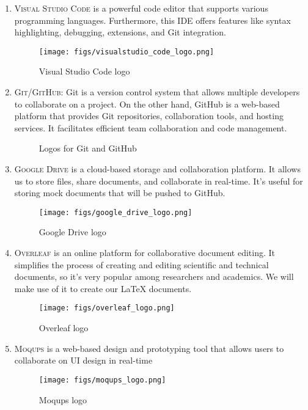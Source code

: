 \documentclass[conference]{IEEEtran}
\begin{document}
\begin{enumerate}
    \item \textsc{Visual Studio Code} is a powerful code editor that supports various programming languages. Furthermore, this IDE offers features like syntax highlighting, debugging, extensions, and Git integration.
    \begin{figure}[H]
    \centering
    \texttt{[image: figs/visualstudio\_code\_logo.png]}
    \caption{Visual Studio Code logo}
    \label{fig:Visual Studio Code logo}
    \end{figure}

    \item \textsc{Git/GitHub}: Git is a version control system that allows multiple developers to collaborate on a project. On the other hand, GitHub is a web-based platform that provides Git repositories, collaboration tools, and hosting services. It facilitates efficient team collaboration and code management.
    \begin{figure}[H]
    \centering
    \caption{Logos for Git and GitHub}
    \label{fig:Logos}
    \end{figure}    
    
    \item \textsc{Google Drive} is a cloud-based storage and collaboration platform. It allows us to store files, share documents, and collaborate in real-time. It's useful for storing mock documents that will be pushed to GitHub.
    \begin{figure}[H]
    \centering
    \texttt{[image: figs/google\_drive\_logo.png]}
    \caption{Google Drive logo}
    \label{fig:Google Drive logo}
    \end{figure}
    
    \item \textsc{Overleaf} is an online platform for collaborative document editing. It simplifies the process of creating and editing scientific and technical documents, so it’s very popular among researchers and academics. We will make use of it to create our LaTeX documents.  
    \begin{figure}[H]
    \centering
    \texttt{[image: figs/overleaf\_logo.png]}
    \caption{Overleaf logo}
    \label{fig:overleaf logo}
    \end{figure}

    \item \textsc{Moqups} is a web-based design and prototyping tool that allows users to collaborate on UI design in real-time
    \begin{figure}[H]
    \centering
    \texttt{[image: figs/moqups\_logo.png]}
    \caption{Moqups logo}
    \label{fig:Moqups logo}
    \end{figure}
    
\end{enumerate}
\end{document}
